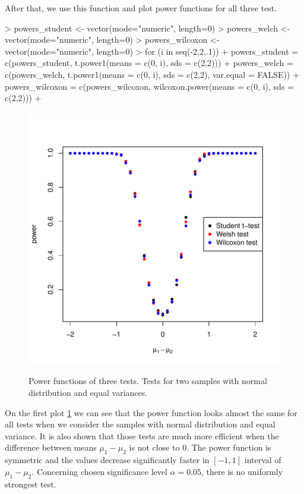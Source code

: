 \documentclass{article}
\begin{document}
After that, we use this function and plot power functions for all three test.
\begin{Schunk}
\begin{Sinput}
>   powers_student <- vector(mode="numeric", length=0)
>   powers_welch <- vector(mode="numeric", length=0)
>   powers_wilcoxon <- vector(mode="numeric", length=0)
>   for (i in seq(-2,2,.1)){
+     powers_student = c(powers_student, t.power1(means = c(0, i), sds = c(2,2)))
+     powers_welch = c(powers_welch, t.power1(means = c(0, i), sds = c(2,2), var.equal = FALSE))
+     powers_wilcoxon = c(powers_wilcoxon, wilcoxon.power(means = c(0, i), sds = c(2,2)))
+   }
\end{Sinput}
\end{Schunk}
\begin{figure}
\center
\includegraphics{p1-task_1_plot}
\label{chart_t1}
\caption{Power functions of three tests. Tests for two samples with normal distribution and equal variances.}
\end{figure}
On the first plot \ref{chart_t1} we can see that the power function looks almost the same for all tests when we consider the samples with normal distribution and equal variance. It is also shown that those tests are much more efficient when the difference between means $\mu_1-\mu_2$ is not close to 0. The power function is symmetric and the values decrease significantly faster in $[-1, 1]$ interval of $\mu_1-\mu_2$. Concerning chosen significance level $\alpha=0.05$, there is no uniformly strongest test.
\end{document}
